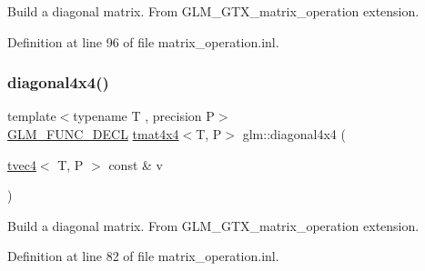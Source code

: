 Build a diagonal matrix. From G\+L\+M\+\_\+\+G\+T\+X\+\_\+matrix\+\_\+operation extension. 

Definition at line 96 of file matrix\+\_\+operation.\+inl.

\mbox{\label{group__gtx__matrix__operation_gade576e044d8e52f343166f665589d782}} 
\subsubsection{\texorpdfstring{diagonal4x4()}{diagonal4x4()}}
{\footnotesize\ttfamily template$<$typename T , precision P$>$ \\
\mbox{\hyperlink{setup_8hpp_ab2d052de21a70539923e9bcbf6e83a51}{G\+L\+M\+\_\+\+F\+U\+N\+C\+\_\+\+D\+E\+CL}} \mbox{\hyperlink{structglm_1_1tmat4x4}{tmat4x4}}$<$T, P$>$ glm\+::diagonal4x4 (\begin{DoxyParamCaption}\item[{\mbox{\hyperlink{structglm_1_1tvec4}{tvec4}}$<$ T, P $>$ const \&}]{v }\end{DoxyParamCaption})}

Build a diagonal matrix. From G\+L\+M\+\_\+\+G\+T\+X\+\_\+matrix\+\_\+operation extension. 

Definition at line 82 of file matrix\+\_\+operation.\+inl.

